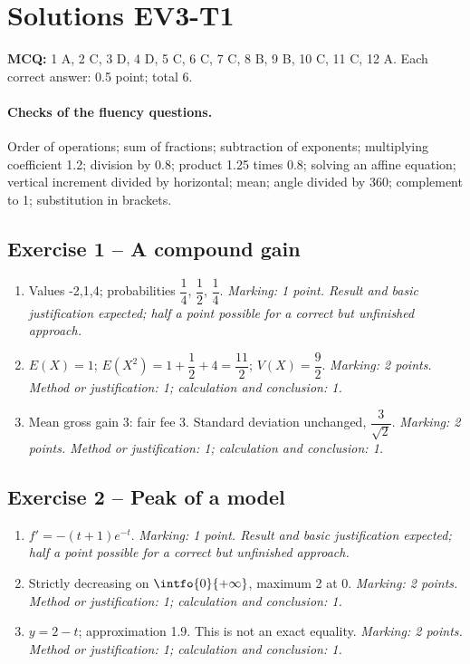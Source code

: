 \mxnewpage\section*{Solutions EV3-T1}\label{EV3-T1-CORR}
\textbf{MCQ:} 1 A, 2 C, 3 D, 4 D, 5 C, 6 C, 7 C, 8 B, 9 B, 10 C, 11 C, 12 A. Each correct answer: \num{0,5} point; total 6.
\paragraph{Checks of the fluency questions.} Order of operations; sum of fractions; subtraction of exponents; multiplying coefficient \num{1,2}; division by \num{0,8}; product \num{1,25} times \num{0,8}; solving an affine equation; vertical increment divided by horizontal; mean; angle divided by 360; complement to 1; substitution in brackets.
\subsection*{Exercise 1 -- A compound gain}
\begin{enumerate}
\item Values -2,1,4; probabilities $\dfrac{1}{4}$, $\dfrac{1}{2}$, $\dfrac{1}{4}$. \textit{Marking: 1 point. Result and basic justification expected; half a point possible for a correct but unfinished approach.}
\item $E(X)=1$; $E(X^2)=1+\dfrac{1}{2}+4=\dfrac{11}{2}$; $V(X)=\dfrac{9}{2}$. \textit{Marking: 2 points. Method or justification: 1; calculation and conclusion: 1.}
\item Mean gross gain 3: fair fee 3. Standard deviation unchanged, $\dfrac{3}{\sqrt 2}$. \textit{Marking: 2 points. Method or justification: 1; calculation and conclusion: 1.}
\end{enumerate}
\subsection*{Exercise 2 -- Peak of a model}
\begin{enumerate}
\item $f\prime=-(t+1)e^{-t}$. \textit{Marking: 1 point. Result and basic justification expected; half a point possible for a correct but unfinished approach.}
\item Strictly decreasing on $\intfo{0}{+\infty}$, maximum 2 at 0. \textit{Marking: 2 points. Method or justification: 1; calculation and conclusion: 1.}
\item $y=2-t$; approximation \num{1,9}. This is not an exact equality. \textit{Marking: 2 points. Method or justification: 1; calculation and conclusion: 1.}
\end{enumerate}
